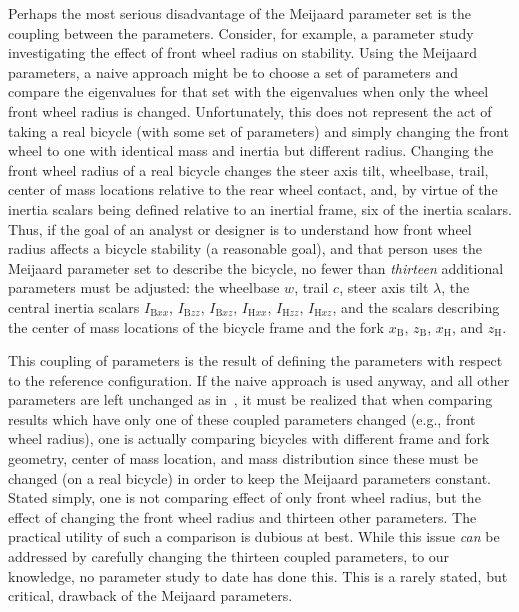 Perhaps the most serious disadvantage of the Meijaard parameter set is the
coupling between the parameters. Consider, for example, a parameter study
investigating the effect of front wheel radius on stability.  Using the
Meijaard parameters, a naive approach might be to choose a set of parameters
and compare the eigenvalues for that set with the eigenvalues when only the
wheel front wheel radius is changed. Unfortunately, this does not represent the
act of taking a real bicycle (with some set of parameters) and simply changing
the front wheel to one with identical mass and inertia but different radius.
Changing the front wheel radius of a real bicycle changes the steer axis tilt,
wheelbase, trail, center of mass locations relative to the rear wheel contact,
and, by virtue of the inertia scalars being defined relative to an inertial
frame, six of the inertia scalars. Thus, if the goal of an analyst or designer
is to understand how front wheel radius affects a bicycle stability (a
reasonable goal), and that person uses the Meijaard parameter set to describe
the bicycle, no fewer than \textit{thirteen} additional parameters must be
adjusted: the wheelbase $w$, trail $c$, steer axis tilt $\lambda$, the central
inertia scalars $I_{\text{B}xx}$, $I_{\text{B}zz}$, $I_{\text{B}xz}$,
$I_{\text{H}xx}$, $I_{\text{H}zz}$, $I_{\text{H}xz}$, and the scalars
describing the center of mass locations of the bicycle frame and the fork
$x_\text{B}$, $z_\text{B}$, $x_\text{H}$, and $z_\text{H}$.

This coupling of parameters is the result of defining the parameters with
respect to the reference configuration. If the naive approach is used anyway,
and all other parameters are left unchanged as in~\cite{Moore2008,Tak2010}, it
must be realized that when comparing results which have only one of these
coupled parameters changed (e.g., front wheel radius), one is actually
comparing bicycles with different frame and fork geometry, center of mass
location, and mass distribution since these must be changed (on a real bicycle)
in order to keep the Meijaard parameters constant.  Stated simply, one is not
comparing effect of only front wheel radius, but the effect of changing the
front wheel radius and thirteen other parameters. The practical utility of such
a comparison is dubious at best. While this issue \textit{can} be addressed by
carefully changing the thirteen coupled parameters, to our knowledge, no
parameter study to date has done this. This is a rarely stated, but critical,
drawback of the Meijaard parameters.

